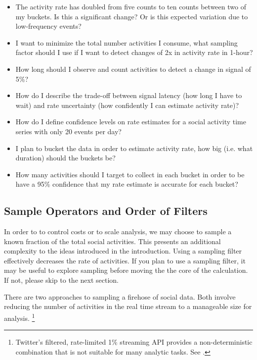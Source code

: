 \documentclass{article}
\begin{document}
\begin{itemize}
	\item The activity rate has doubled from five counts to ten counts between two of my buckets. Is this a significant change? 
	Or is this expected variation due to low-frequency events?
	\item I want to minimize the total number activities I consume, what sampling factor should I use if I want to detect
	changes of 2x in activity rate in 1-hour?
	\item How long should I observe and count activities to detect a change in signal of 5\%?
	\item How do I describe the trade-off between signal latency (how long I have to wait) and rate uncertainty (how 
	confidently I can estimate activity rate)?
	\item How do I define confidence levels on rate estimates for a social activity time series with only 20 events per day?
	\item I plan to bucket the data in order to estimate activity rate, how big (i.e. what duration) should the buckets be? 
	\item How many activities should I target to collect in each bucket in order to be have a 95\% confidence that my 
	rate estimate is accurate for each bucket? 
\end{itemize}

\subsection{Sample Operators and Order of Filters} 

In order to to control costs or to scale analysis, we may choose to sample a known fraction of the total social activities. This presents an
additional complexity to the ideas introduced in the introduction. Using a sampling filter effectively decreases the rate of activities. If you
plan to use a sampling filter, it may be useful to explore sampling before moving the the core of the calculation.  
If not, please skip to the next section.

There are two approaches to sampling a firehose of social data. Both involve reducing the number of activities in the 
real time stream to a manageable size for analysis. \footnote{Twitter's filtered, rate-limited 1\% streaming API provides a 
non-deterministic combination that is not suitable for many analytic tasks.  See \cite{Morstatter:2013}.} 
\end{document}
